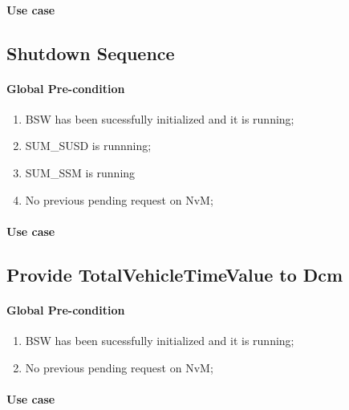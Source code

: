 \paragraph{Use case}


\subsection{Shutdown Sequence}
\label{subsec:ShutdownSequence}
\paragraph{Global Pre-condition}
\begin{enumerate}
	\item BSW has been sucessfully initialized and it is running;
	\item SUM\_SUSD is runnning;
	\item SUM\_SSM is running
	\item No previous pending request on NvM;
\end{enumerate}

\paragraph{Use case}


\subsection{Provide TotalVehicleTimeValue to Dcm}
\paragraph{Global Pre-condition}
\begin{enumerate}
	\item BSW has been sucessfully initialized and it is running;
	\item No previous pending request on NvM;
\end{enumerate}

\paragraph{Use case}


